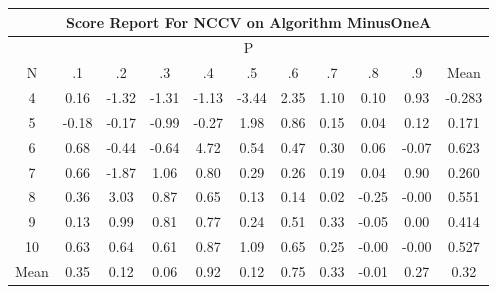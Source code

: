 \documentclass[11pt,a4paper]{report}
\begin{document}
\begin{longtable}{ | c || c | c | c | c | c | c | c | c | c || c |}
\hline
\multicolumn{11}{|c|}{ Score Report For NCCV on Algorithm MinusOneA} \\
\hline
\multicolumn{11}{|c|}{ P } \\
\hline
N & .1 & .2 & .3 & .4 & .5 & .6 & .7 & .8 & .9 & Mean\\
 \hline
 \hline
 \endhead
  4 &  \cellcolor[HTML]{F7F7FF} 0.16 &  \cellcolor[HTML]{FFDFDF} -1.32 &  \cellcolor[HTML]{FFDFDF} -1.31 &  \cellcolor[HTML]{FFDFDF} -1.13 &  \cellcolor[HTML]{FFA7A7} -3.44 &  \cellcolor[HTML]{C7C7FF} 2.35 &  \cellcolor[HTML]{E7E7FF} 1.10 &  \cellcolor[HTML]{FFFFFF} 0.10 &  \cellcolor[HTML]{E7E7FF} 0.93 & -0.283 \\
  5 &  \cellcolor[HTML]{FFF7F7} -0.18 &  \cellcolor[HTML]{FFF7F7} -0.17 &  \cellcolor[HTML]{FFE7E7} -0.99 &  \cellcolor[HTML]{FFF7F7} -0.27 &  \cellcolor[HTML]{CFCFFF} 1.98 &  \cellcolor[HTML]{E7E7FF} 0.86 &  \cellcolor[HTML]{FFFFFF} 0.15 &  \cellcolor[HTML]{FFFFFF} 0.04 &  \cellcolor[HTML]{FFFFFF} 0.12 & 0.171 \\
  6 &  \cellcolor[HTML]{EFEFFF} 0.68 &  \cellcolor[HTML]{FFF7F7} -0.44 &  \cellcolor[HTML]{FFEFEF} -0.64 &  \cellcolor[HTML]{8787FF} 4.72 &  \cellcolor[HTML]{EFEFFF} 0.54 &  \cellcolor[HTML]{F7F7FF} 0.47 &  \cellcolor[HTML]{F7F7FF} 0.30 &  \cellcolor[HTML]{FFFFFF} 0.06 &  \cellcolor[HTML]{FFFFFF} -0.07 & 0.623 \\
  7 &  \cellcolor[HTML]{EFEFFF} 0.66 &  \cellcolor[HTML]{FFCFCF} -1.87 &  \cellcolor[HTML]{E7E7FF} 1.06 &  \cellcolor[HTML]{E7E7FF} 0.80 &  \cellcolor[HTML]{F7F7FF} 0.29 &  \cellcolor[HTML]{F7F7FF} 0.26 &  \cellcolor[HTML]{F7F7FF} 0.19 &  \cellcolor[HTML]{FFFFFF} 0.04 &  \cellcolor[HTML]{E7E7FF} 0.90 & 0.260 \\
  8 &  \cellcolor[HTML]{F7F7FF} 0.36 &  \cellcolor[HTML]{AFAFFF} 3.03 &  \cellcolor[HTML]{E7E7FF} 0.87 &  \cellcolor[HTML]{EFEFFF} 0.65 &  \cellcolor[HTML]{FFFFFF} 0.13 &  \cellcolor[HTML]{FFFFFF} 0.14 &  \cellcolor[HTML]{FFFFFF} 0.02 &  \cellcolor[HTML]{FFF7F7} -0.25 &  \cellcolor[HTML]{FFFFFF} -0.00 & 0.551 \\
  9 &  \cellcolor[HTML]{FFFFFF} 0.13 &  \cellcolor[HTML]{E7E7FF} 0.99 &  \cellcolor[HTML]{E7E7FF} 0.81 &  \cellcolor[HTML]{EFEFFF} 0.77 &  \cellcolor[HTML]{F7F7FF} 0.24 &  \cellcolor[HTML]{EFEFFF} 0.51 &  \cellcolor[HTML]{F7F7FF} 0.33 &  \cellcolor[HTML]{FFFFFF} -0.05 &  \cellcolor[HTML]{FFFFFF} 0.00 & 0.414 \\
  10 &  \cellcolor[HTML]{EFEFFF} 0.63 &  \cellcolor[HTML]{EFEFFF} 0.64 &  \cellcolor[HTML]{EFEFFF} 0.61 &  \cellcolor[HTML]{E7E7FF} 0.87 &  \cellcolor[HTML]{E7E7FF} 1.09 &  \cellcolor[HTML]{EFEFFF} 0.65 &  \cellcolor[HTML]{F7F7FF} 0.25 &  \cellcolor[HTML]{FFFFFF} -0.00 &  \cellcolor[HTML]{FFFFFF} -0.00 & 0.527 \\
 \hline
 \hline
Mean &  \cellcolor[HTML]{F7F7FF} 0.35 &  \cellcolor[HTML]{FFFFFF} 0.12 &  \cellcolor[HTML]{FFFFFF} 0.06 &  \cellcolor[HTML]{E7E7FF} 0.92 &  \cellcolor[HTML]{FFFFFF} 0.12 &  \cellcolor[HTML]{EFEFFF} 0.75 &  \cellcolor[HTML]{F7F7FF} 0.33 &  \cellcolor[HTML]{FFFFFF} -0.01 &  \cellcolor[HTML]{F7F7FF} 0.27 &  \cellcolor[HTML]{F7F7FF} 0.32
\end{longtable}
\end{document}
